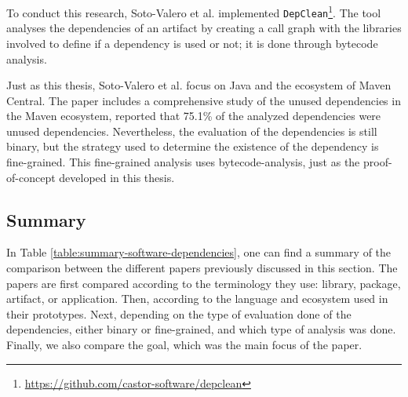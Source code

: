 To conduct this research, Soto-Valero et al. implemented \texttt{DepClean}\footnote{\href{https://github.com/castor-software/depclean}{https://github.com/castor-software/depclean}}. The tool analyses the dependencies of an artifact by creating a call graph with the libraries involved to define if a dependency is used or not; it is done through bytecode analysis.

Just as this thesis, Soto-Valero et al. focus on Java and the ecosystem of Maven Central. The paper includes a comprehensive study of the unused dependencies in the Maven ecosystem, reported that 75.1\% of the analyzed dependencies were unused dependencies. Nevertheless, the evaluation of the dependencies is still binary, but the strategy used to determine the existence of the dependency is fine-grained. This fine-grained analysis uses bytecode-analysis, just as the proof-of-concept developed in this thesis.

\subsection{Summary}

In Table \ref{table:summary-software-dependencies}, one can find a summary of the comparison between the different papers previously discussed in this section. The papers are first compared according to the terminology they use: library, package, artifact, or application. Then, according to the language and ecosystem used in their prototypes. Next, depending on the type of evaluation done of the dependencies, either binary or fine-grained, and which type of analysis was done. Finally, we also compare the goal, which was the main focus of the paper.

